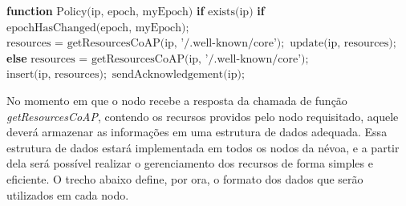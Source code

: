 \begin{algorithm}[H]
    \begin{center}
        \begin{algorithmic}[1]
            \STATE \textbf{function} $\text{Policy(ip, epoch, myEpoch)}$
            \STATE \hspace{\algorithmicindent} \textbf{if} $\text{exists(ip)}$
            \STATE \hspace{\algorithmicindent} \hspace{\algorithmicindent} \textbf{if} $\text{epochHasChanged(epoch, myEpoch)};$
            \STATE \hspace{\algorithmicindent} \hspace{\algorithmicindent} \hspace{\algorithmicindent} $\text{resources = getResourcesCoAP(ip, '/.well-known/core')};$
            \STATE \hspace{\algorithmicindent} \hspace{\algorithmicindent} \hspace{\algorithmicindent} $\text{update(ip, resources)};$
            \STATE \hspace{\algorithmicindent} \textbf{else}
            \STATE \hspace{\algorithmicindent} \hspace{\algorithmicindent} $\text{resources = getResourcesCoAP(ip, '/.well-known/core')};$
            \STATE \hspace{\algorithmicindent} \hspace{\algorithmicindent} $\text{insert(ip, resources)};$
            \STATE \hspace{\algorithmicindent} $\text{sendAcknowledgement(ip)};$

        \end{algorithmic}
    \end{center}
    \caption[Política de atualização de recursos]%
        {\label{alg:alg1} Política de atualização de recursos.}%
    \end{algorithm}

No momento em que o nodo recebe a resposta da chamada de função \textit{getResourcesCoAP}, contendo os recursos providos pelo nodo requisitado, aquele deverá armazenar as informações em uma estrutura de dados adequada.
Essa estrutura de dados estará implementada em todos os nodos da névoa, e a partir dela será possível realizar o gerenciamento dos recursos de forma simples e eficiente.
O trecho abaixo define, por ora, o formato dos dados que serão utilizados em cada nodo.


